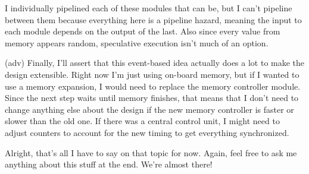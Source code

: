 \documentclass[14pt, table]{beamer}
\begin{document}
{I individually pipelined each of these modules that can be, but I can't pipeline between them because everything here is a pipeline hazard, meaning the input to each module depends on the output of the last. Also since every value from memory appears random, speculative execution isn't much of an option.

(adv) Finally, I'll assert that this event-based idea actually does a lot to make the design extensible. Right now I'm just using on-board memory, but if I wanted to use a memory expansion, I would need to replace the memory controller module. Since the next step waits until memory finishes, that means that I don't need to change anything else about the design if the new memory controller is faster or slower than the old one. If there was a central control unit, I might need to adjust counters to account for the new timing to get everything synchronized.

Alright, that's all I have to say on that topic for now. Again, feel free to ask me anything about this stuff at the end. We're almost there!

}
\end{document}
